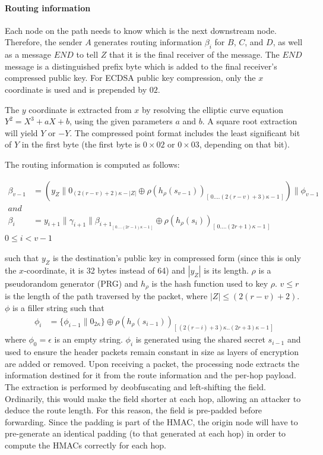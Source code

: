 \paragraph{Routing information}
Each node on the path needs to know which is the next downstream node. Therefore, the sender $A$ generates routing information $\beta_i$ for $B$, $C$, and $D$, as well as a message $END$ to tell $Z$ that it is the final receiver of the message. 
The $END$ message is a distinguished prefix byte which is added to the final receiver's compressed public key.
For ECDSA public key compression, only the $x$ coordinate is used and is prepended by $02$. 

The $y$ coordinate is extracted from $x$ by resolving the elliptic curve equation $Y^2=X^3+aX+b$, using the given parameters $a$ and $b$. A square root extraction will yield $Y$ or $-Y$. The compressed point format includes the least significant bit of $Y$ in the first byte (the first byte is $0\times02$ or $0\times03$, depending on that bit).

The routing information is computed as follows:

\begin{align}  
    \beta_{v-1} &=(y_Z\|0_{(2(r-v)+2)\kappa-|Z|}\oplus \rho(h_{\rho}(s_{v-1}))_{[ \,0....(2(r-v)+3)\kappa-1\,]})\|\phi_{v-1}\\
    and &\nonumber \\
    \beta_i &=y_{i+1}\|\gamma_{i+1}\|\beta_{{i+1}_{[ \,0....(2r-1)\kappa-1\,] }}\oplus \rho(h_{\rho}(s_{i}))_{[ \,0....(2r+1)\kappa-1\,]} 
    \label{eq:2}
\end{align}
$0\le i < v-1$

such that $y_Z$ is the destination's public key in compressed form (since this is only the $x$-coordinate, it is 32 bytes instead of 64) and $|y_Z|$ is its length. $\rho$ is a pseudorandom generator (PRG) and $h_{\rho}$ is the hash function used to key $\rho$.
$v\leq r$ is the length of the path traversed by the packet, where $|Z| \leq (2(r - v) + 2)$. $\phi$ is a filler string such that
\begin{align}  
    \phi_i&=\{ \phi_{i-1}\|0_{2\kappa}\}\oplus \rho(h_{\rho}(s_{i-1}))_{[ \,(2(r-i)+3)\kappa..(2r+3)\kappa-1\,]}
\end{align}
where $\phi_0=\epsilon$ is an empty string. $\phi_i$ is generated using the shared secret $s_{i-1}$ and used to ensure the header packets remain constant in size as layers of encryption are added or removed. Upon receiving a packet, the processing node extracts the information destined for it from the route information and the per-hop payload. The extraction is performed by deobfuscating and left-shifting the field. Ordinarily, this would make the field shorter at each hop, allowing an attacker to deduce the route length. For this reason, the field is pre-padded before forwarding. Since the padding is part of the HMAC, the origin node will have to pre-generate an identical padding (to that generated at each hop) in order to compute the HMACs correctly for each hop.
    
